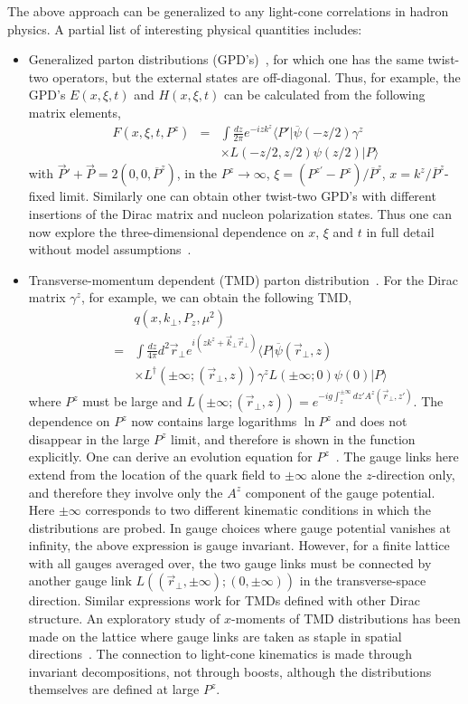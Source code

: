 \documentclass[aps,prd,preprint,tightenlines,superscriptaddress]{revtex4}
\begin{document}
The above approach can be generalized to any light-cone correlations in hadron physics.
A partial list of interesting physical quantities includes:
\begin{itemize}
\item{Generalized parton distributions (GPD's)~\cite{Ji:1996ek}, for which one has the same twist-two operators, but the external
states are off-diagonal. Thus, for example, the GPD's $E(x,\xi, t)$ and $H(x, \xi, t)$  can be calculated
from the following matrix elements,
\begin{eqnarray}
  F(x, \xi, t, P^z) &=& \int \frac{dz}{2\pi} e^{-izk^z}\langle P'|\overline\psi(-z/2)\gamma^z \\ && \times L(-z/2,z/2)\psi(z/2)|P\rangle \nonumber
\end{eqnarray}
with $\vec{P}'+\vec{P}=2(0,0,\overline{P}^z)$, in the $P^z\rightarrow \infty$, $\xi= (P^{z'}-P^z)/\overline{P}^z$, $x=k^z/\overline{P}^z$-fixed limit. Similarly one can obtain other twist-two GPD's with different insertions of the Dirac matrix and nucleon polarization states.
Thus one can now explore the three-dimensional dependence on $x$, $\xi$ and $t$ in full detail without model assumptions~\cite{Hagler:2003jd}.}

\item{Transverse-momentum dependent (TMD) parton distribution~\cite{collins}.  For the Dirac matrix $\gamma^z$, for example, we can obtain the following TMD,
\begin{eqnarray}
  && q(x,k_\perp, P_z, \mu^2)\nonumber \\ &=& \int \frac{dz}{4\pi} d^2\vec{r}_\perp e^{i(zk^z+\vec{k}_\perp \vec{r}_\perp)}  \langle P|\overline{\psi}(\vec{r}_\perp,z)
    \\ && \times L^\dagger\left(\pm\infty; (\vec{r}_\perp,z)\right)\gamma^z L(\pm\infty; 0)\psi(0) |P\rangle \nonumber
\end{eqnarray}
where $P^z$ must be large and $L\left(\pm\infty; (\vec{r}_\perp, z)\right) = e^{-ig\int^{\pm\infty}_{z} dz' A^z(\vec{r}_\perp, z')}$. The dependence
on $P^z$ now contains large logarithms $\ln P^z$ and does not disappear in the large $P^z$ limit, and therefore is shown in the function explicitly.
One can derive an evolution equation for $P^z$~\cite{collins}.
The gauge links here extend from the location of the quark field to $\pm \infty$
alone the $z$-direction only, and therefore they involve only the $A^z$ component of the gauge potential. Here $\pm\infty$ corresponds to two different kinematic
conditions in which the distributions are probed. In gauge choices where gauge potential vanishes at infinity, the above expression is gauge invariant.
However, for a finite lattice with all gauges averaged over, the two gauge links must be connected by another gauge link $L((\vec{r}_\perp, \pm\infty);(0,\pm \infty))$ in the transverse-space direction. Similar expressions work for TMDs defined with other Dirac structure. An exploratory study of $x$-moments of TMD distributions has been made on the lattice where gauge links are taken as staple in spatial directions~\cite{Musch:2010ka}. The connection to light-cone kinematics
is made through invariant decompositions, not through boosts, although the distributions themselves are defined at large $P^z$.}


\end{itemize}
\end{document}
